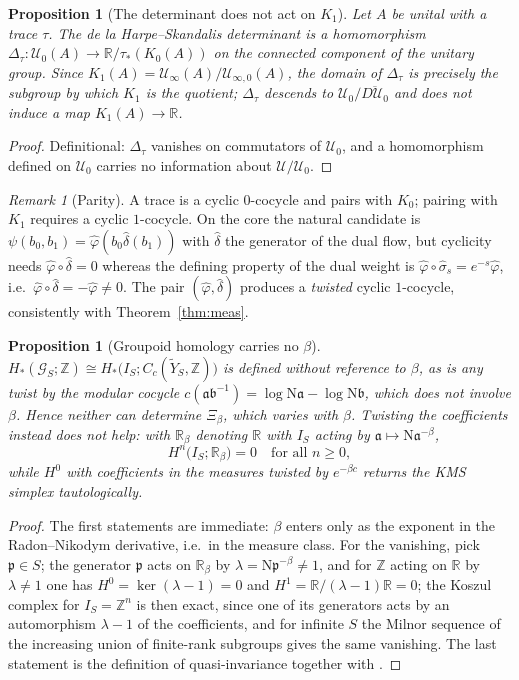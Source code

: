 \documentclass[11pt]{amsart}
\numberwithin{equation}{section}
\newtheorem{proposition}[theorem]{Proposition}
\theoremstyle{definition}
\theoremstyle{remark}
\newtheorem{remark}[theorem]{Remark}
\newcommand{\Z}{\mathbb{Z}}
\newcommand{\R}{\mathbb{R}}
\newcommand{\cG}{\mathcal{G}}
\newcommand{\cU}{\mathcal{U}}
\newcommand{\pp}{\mathfrak{p}}
\newcommand{\aaa}{\mathfrak{a}}
\newcommand{\Ns}{\mathrm{N}}
\begin{document}
\begin{proposition}[The determinant does not act on $K_1$]\label{prop:dlhs}
Let $A$ be unital with a trace $\tau$. The de la Harpe--Skandalis determinant \cite{dlHS} is
a homomorphism $\Delta_\tau:\cU_0(A)\to\R/\tau_*(K_0(A))$ on the connected component of the
unitary group. Since $K_1(A)=\cU_\infty(A)/\cU_{\infty,0}(A)$, the domain of $\Delta_\tau$ is
precisely the subgroup by which $K_1$ is the quotient; $\Delta_\tau$ descends to
$\cU_0/\overline{D\cU_0}$ and does not induce a map $K_1(A)\to\R$.
\end{proposition}

\begin{proof}
Definitional: $\Delta_\tau$ vanishes on commutators of $\cU_0$, and a homomorphism defined
on $\cU_0$ carries no information about $\cU/\cU_0$.
\end{proof}

\begin{remark}[Parity]\label{rem:parity}
A trace is a cyclic $0$-cocycle and pairs with $K_0$; pairing with $K_1$ requires a cyclic
$1$-cocycle. On the core the natural candidate is
$\psi(b_0,b_1)=\hat\varphi(b_0\hat\delta(b_1))$ with $\hat\delta$ the generator of the dual
flow, but cyclicity needs $\hat\varphi\circ\hat\delta=0$ whereas the defining property of the
dual weight is $\hat\varphi\circ\hat\sigma_s=e^{-s}\hat\varphi$, i.e.\
$\hat\varphi\circ\hat\delta=-\hat\varphi\ne0$. The pair $(\hat\varphi,\hat\delta)$ produces a
\emph{twisted} cyclic $1$-cocycle, consistently with Theorem~\ref{thm:meas}.
\end{remark}

\begin{proposition}[Groupoid homology carries no $\beta$]\label{prop:homology}
$H_*(\cG_S;\Z)\cong H_*\bigl(I_S;C_c(\widetilde Y_S,\Z)\bigr)$ is defined without reference
to $\beta$, as is any twist by the modular cocycle $c(\aaa\mathfrak b^{-1})=\log\Ns\aaa-\log\Ns\mathfrak b$,
which does not involve $\beta$. Hence neither can determine $\Xi_\beta$, which varies with
$\beta$. Twisting the coefficients instead does not help: with $\R_\beta$ denoting $\R$ with
$I_S$ acting by $\aaa\mapsto\Ns\aaa^{-\beta}$,
\[
H^n\bigl(I_S;\R_\beta\bigr)=0\quad\text{for all }n\ge0,
\]
while $H^0$ with coefficients in the measures twisted by $e^{-\beta c}$ returns the KMS
simplex tautologically.
\end{proposition}

\begin{proof}
The first statements are immediate: $\beta$ enters only as the exponent in the
Radon--Nikodym derivative, i.e.\ in the measure class. For the vanishing, pick $\pp\in S$;
the generator $\pp$ acts on $\R_\beta$ by $\lambda=\Ns\pp^{-\beta}\ne1$, and for $\Z$ acting
on $\R$ by $\lambda\ne1$ one has $H^0=\ker(\lambda-1)=0$ and $H^1=\R/(\lambda-1)\R=0$; the
Koszul complex for $I_S=\Z^n$ is then exact, since one of its generators acts by an
automorphism $\lambda-1$ of the coefficients, and for infinite $S$ the Milnor sequence of
the increasing union of finite-rank subgroups gives the same vanishing. The last statement is the definition of
quasi-invariance together with \cite[Prop.~2.8]{Main}.
\end{proof}
\end{document}
